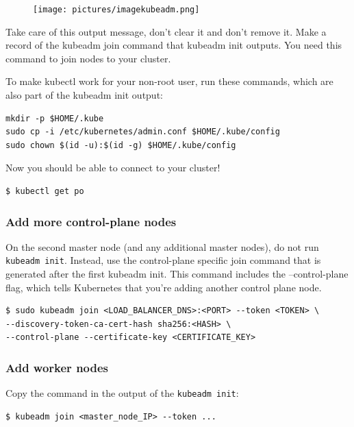 \documentclass{article}
\newenvironment{blocktemplateIII}[1]{%
    \tcolorbox[beamer,%
    noparskip,breakable,
    ,colframe=Red,%
    colbacklower=LimeGreen!75!LightGreen,%
    title=#1]}%
    {\endtcolorbox}
\newenvironment{codetemplate}[1][]{%
  \mybasecolorbox[#1]
  \itshape
}{%
  \endmybasecolorbox
}
\begin{document}
\begin{figure}[H]
    \centering
    \texttt{[image: pictures/imagekubeadm.png]}
\end{figure}

\begin{blocktemplateIII}{WARNING}
Take care of this output message, don't clear it and don't remove it. Make a record of the kubeadm join command that kubeadm init outputs. You need this command to join nodes to your cluster.
\end{blocktemplateIII}

To make kubectl work for your non-root user, run these commands, which are also part of the kubeadm init output:
\begin{codetemplate}{}
\begin{verbatim}
mkdir -p $HOME/.kube
sudo cp -i /etc/kubernetes/admin.conf $HOME/.kube/config
sudo chown $(id -u):$(id -g) $HOME/.kube/config
\end{verbatim}
\end{codetemplate}

Now you should be able to connect to your cluster!
\begin{codetemplate}{}
\begin{verbatim}
$ kubectl get po
\end{verbatim}
\end{codetemplate}

\subsubsection{Add more control-plane nodes}
On the second master node (and any additional master nodes), do not run \verb|kubeadm init|. Instead, use the control-plane specific join command that is generated after the first kubeadm init. This command includes the --control-plane flag, which tells Kubernetes that you're adding another control plane node.
\begin{codetemplate}{}
\begin{verbatim}
$ sudo kubeadm join <LOAD_BALANCER_DNS>:<PORT> --token <TOKEN> \
--discovery-token-ca-cert-hash sha256:<HASH> \
--control-plane --certificate-key <CERTIFICATE_KEY>
\end{verbatim}
\end{codetemplate}

\subsubsection{Add worker nodes}
Copy the command in the output of the \verb|kubeadm init|:
\begin{codetemplate}{}
\begin{verbatim}
$ kubeadm join <master_node_IP> --token ...
\end{verbatim}
\end{codetemplate}
\end{document}
